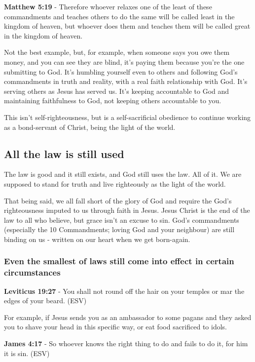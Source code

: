 \documentclass[11pt]{article}
\begin{document}
\textbf{Matthew 5:19} - Therefore whoever relaxes one of the least of these commandments and teaches others to do the same will be called least in the kingdom of heaven, but whoever does them and teaches them will be called great in the kingdom of heaven.

Not the best example, but, for example, when someone says you owe them money, and you can see they are blind, it's paying them because you're the one submitting to God.
It's humbling yourself even to others and following God's commandments in truth and reality, with a real faith relationship with God.
It's serving others as Jesus has served us.
It's keeping accountable to God and maintaining faithfulness to God, not keeping others accountable to you.

This isn't self-righteousness, but is a self-sacrificial obedience to continue working as a bond-servant of Christ, being the light of the world.

\subsection{All the law is still used}
\label{sec:orgd7c7bc8}
The law is good and it still exists, and God still uses the law. All of it. We are supposed to stand for truth and live righteously as the light of the world.

That being said, we all fall short of the glory of God and require the God's righteousness imputed to us through faith in Jesus.
Jesus Christ is the end of the law to all who believe, but grace isn't an excuse to sin.
God's commandments (especially the 10 Commandments; loving God and your neighbour) are still binding on us - written on our heart when we get born-again.

\subsubsection{Even the smallest of laws still come into effect in certain circumstances}
\label{sec:org4b2ab27}

\textbf{Leviticus 19:27} - You shall not round off the hair on your temples or mar the edges of your beard. (ESV)

For example, if Jesus sends you as an ambassador to some pagans and they asked you to shave your head in this specific way, or eat food sacrificed to idols.

\textbf{James 4:17} -  So whoever knows the right thing to do and fails to do it, for him it is sin.  (ESV)
\end{document}
